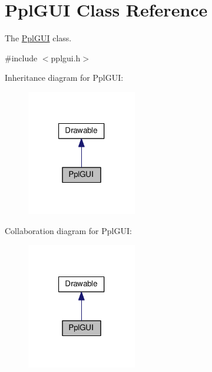 \hypertarget{classPplGUI}{\section{Ppl\-G\-U\-I Class Reference}
\label{classPplGUI}
}


The \hyperlink{classPplGUI}{Ppl\-G\-U\-I} class.  




{\ttfamily \#include $<$pplgui.\-h$>$}



Inheritance diagram for Ppl\-G\-U\-I\-:
\nopagebreak
\begin{figure}[H]
\begin{center}
\leavevmode
\includegraphics[width=136pt]{classPplGUI__inherit__graph}
\end{center}
\end{figure}


Collaboration diagram for Ppl\-G\-U\-I\-:
\nopagebreak
\begin{figure}[H]
\begin{center}
\leavevmode
\includegraphics[width=136pt]{classPplGUI__coll__graph}
\end{center}
\end{figure}
